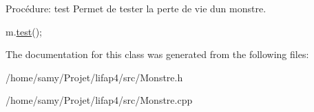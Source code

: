 Procédure\+: test Permet de tester la perte de vie d\textquotesingle{}un monstre. 


\begin{DoxyCode}
m.\hyperlink{classMonstre_a4f22d17531f5ca164355740d035485ee}{test}();
\end{DoxyCode}
 

The documentation for this class was generated from the following files\+:\begin{DoxyCompactItemize}
\item 
/home/samy/\+Projet/lifap4/src/Monstre.\+h\item 
/home/samy/\+Projet/lifap4/src/Monstre.\+cpp\end{DoxyCompactItemize}
